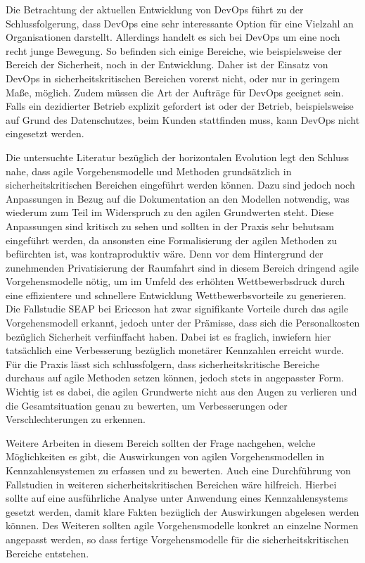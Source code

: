 Die Betrachtung der aktuellen Entwicklung von DevOps führt zu der Schlussfolgerung, dass DevOps eine sehr interessante Option für eine Vielzahl an Organisationen darstellt. 
Allerdings handelt es sich bei DevOps um eine noch recht junge Bewegung. 
So befinden sich einige Bereiche, wie beispielsweise der Bereich der Sicherheit, noch in der Entwicklung. 
Daher ist der Einsatz von DevOps in sicherheitskritischen Bereichen vorerst nicht, oder nur in geringem Maße, möglich. Zudem müssen die Art der Aufträge für DevOps geeignet sein. 
Falls ein dezidierter Betrieb explizit gefordert ist oder der Betrieb, beispielsweise auf Grund des Datenschutzes, beim Kunden stattfinden muss, kann DevOps nicht eingesetzt werden.

Die untersuchte Literatur bezüglich der horizontalen Evolution legt den Schluss nahe, dass agile Vorgehensmodelle und Methoden grundsätzlich in sicherheitskritischen Bereichen eingeführt werden können.
Dazu sind jedoch noch Anpassungen in Bezug auf die Dokumentation an den Modellen notwendig, was wiederum zum Teil im Widerspruch zu den agilen Grundwerten steht.
Diese Anpassungen sind kritisch zu sehen und sollten in der Praxis sehr behutsam eingeführt werden, da ansonsten eine Formalisierung der agilen Methoden zu befürchten ist, was kontraproduktiv wäre.
Denn vor dem Hintergrund der zunehmenden Privatisierung der Raumfahrt sind in diesem Bereich dringend agile Vorgehensmodelle nötig, um im Umfeld des erhöhten Wettbewerbsdruck durch eine effizientere und schnellere Entwicklung Wettbewerbsvorteile zu generieren.
Die Fallstudie SEAP bei Ericcson hat zwar signifikante Vorteile durch das agile Vorgehensmodell erkannt, jedoch unter der Prämisse, dass sich die Personalkosten bezüglich Sicherheit verfünffacht haben.
Dabei ist es fraglich, inwiefern hier tatsächlich eine Verbesserung bezüglich monetärer Kennzahlen erreicht wurde.
Für die Praxis lässt sich schlussfolgern, dass sicherheitskritische Bereiche durchaus auf agile Methoden setzen können, jedoch stets in angepasster Form.
Wichtig ist es dabei, die agilen Grundwerte nicht aus den Augen zu verlieren und die Gesamtsituation genau zu bewerten, um Verbesserungen oder Verschlechterungen zu erkennen.

Weitere Arbeiten in diesem Bereich sollten der Frage nachgehen, welche Möglichkeiten es gibt, die Auswirkungen von agilen Vorgehensmodellen in Kennzahlensystemen zu erfassen und zu bewerten.
Auch eine Durchführung von Fallstudien in weiteren sicherheitskritischen Bereichen wäre hilfreich. 
Hierbei sollte auf eine ausführliche Analyse unter Anwendung eines Kennzahlensystems gesetzt werden, damit klare Fakten bezüglich der Auswirkungen abgelesen werden können.
Des Weiteren sollten agile Vorgehensmodelle konkret an einzelne Normen angepasst werden, so dass fertige Vorgehensmodelle für die sicherheitskritischen Bereiche entstehen.

